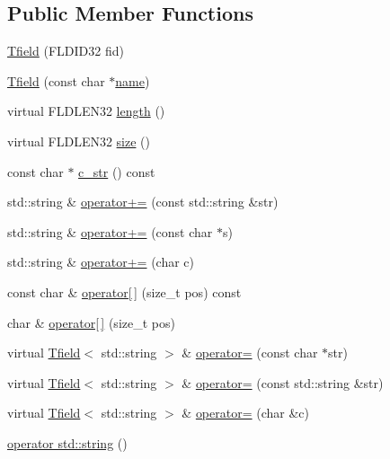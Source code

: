 \subsection*{Public Member Functions}
\begin{DoxyCompactItemize}
\item 
\hyperlink{classatmi_1_1_tfield_3_01std_1_1string_01_4_a46059c3e91ce3847b3109e4500f017f6}{Tfield} (F\+L\+D\+I\+D32 fid)
\item 
\hyperlink{classatmi_1_1_tfield_3_01std_1_1string_01_4_a389e62b3a50784fac584718796f3bd62}{Tfield} (const char $\ast$\hyperlink{classatmi_1_1field_a94aab112ec52966a2a772d219e87a965}{name})
\item 
virtual F\+L\+D\+L\+E\+N32 \hyperlink{classatmi_1_1_tfield_3_01std_1_1string_01_4_ac4fdf6b5f9d1929b34bddc97274c6c9b}{length} ()
\item 
virtual F\+L\+D\+L\+E\+N32 \hyperlink{classatmi_1_1_tfield_3_01std_1_1string_01_4_aea88f61cd27f8f258ee473e0e938790b}{size} ()
\item 
const char $\ast$ \hyperlink{classatmi_1_1_tfield_3_01std_1_1string_01_4_a775ddd0103e3e3f0fc85dfda5df72280}{c\+\_\+str} () const 
\item 
std\+::string \& \hyperlink{classatmi_1_1_tfield_3_01std_1_1string_01_4_a0ae5aeb1f751da7fb31c4a756141ef79}{operator+=} (const std\+::string \&str)
\item 
std\+::string \& \hyperlink{classatmi_1_1_tfield_3_01std_1_1string_01_4_afc6a279456872094b29c874d140294e8}{operator+=} (const char $\ast$s)
\item 
std\+::string \& \hyperlink{classatmi_1_1_tfield_3_01std_1_1string_01_4_a3800087db4dfe0e4c5441f004f6d10c9}{operator+=} (char c)
\item 
const char \& \hyperlink{classatmi_1_1_tfield_3_01std_1_1string_01_4_aeff4f32e684575375cff733f3838d8bc}{operator\mbox{[}$\,$\mbox{]}} (size\+\_\+t pos) const 
\item 
char \& \hyperlink{classatmi_1_1_tfield_3_01std_1_1string_01_4_a21a1c27750ed6b7d61695350e222454b}{operator\mbox{[}$\,$\mbox{]}} (size\+\_\+t pos)
\item 
virtual \hyperlink{classatmi_1_1_tfield}{Tfield}$<$ std\+::string $>$ \& \hyperlink{classatmi_1_1_tfield_3_01std_1_1string_01_4_a21bd47092a2c5957cb49cd1d1dac336b}{operator=} (const char $\ast$str)
\item 
virtual \hyperlink{classatmi_1_1_tfield}{Tfield}$<$ std\+::string $>$ \& \hyperlink{classatmi_1_1_tfield_3_01std_1_1string_01_4_a913f243afaa2a73d402dd8d95966ff52}{operator=} (const std\+::string \&str)
\item 
virtual \hyperlink{classatmi_1_1_tfield}{Tfield}$<$ std\+::string $>$ \& \hyperlink{classatmi_1_1_tfield_3_01std_1_1string_01_4_a07889dbc9492c3f30512c60e8bb543a1}{operator=} (char \&c)
\item 
\hyperlink{classatmi_1_1_tfield_3_01std_1_1string_01_4_ad2ebba17c2215a4e364f762e0400545b}{operator std\+::string} ()
\end{DoxyCompactItemize}

